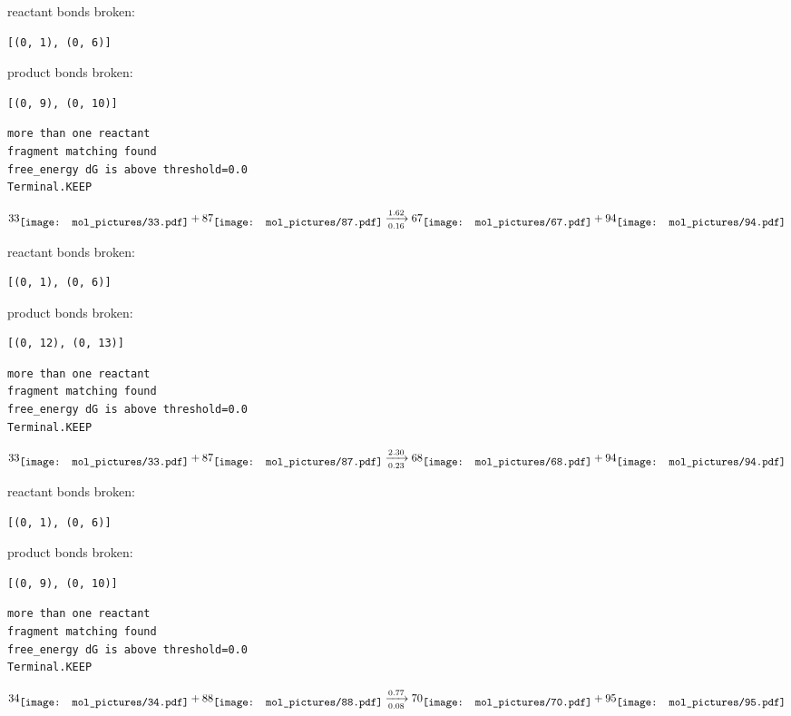 \documentclass{article}
\begin{document}
reactant bonds broken:\begin{verbatim}
[(0, 1), (0, 6)]
\end{verbatim}
product bonds broken:\begin{verbatim}
[(0, 9), (0, 10)]
\end{verbatim}




\vspace{1cm}
\begin{verbatim}
more than one reactant
fragment matching found
free_energy dG is above threshold=0.0
Terminal.KEEP
\end{verbatim}
$$
33
\raisebox{-.5\height}{\texttt{[image: mol\_pictures/33.pdf]}}
+
87
\raisebox{-.5\height}{\texttt{[image: mol\_pictures/87.pdf]}}
\xrightarrow[0.16]{1.62}
67
\raisebox{-.5\height}{\texttt{[image: mol\_pictures/67.pdf]}}
+
94
\raisebox{-.5\height}{\texttt{[image: mol\_pictures/94.pdf]}}
$$


reactant bonds broken:\begin{verbatim}
[(0, 1), (0, 6)]
\end{verbatim}
product bonds broken:\begin{verbatim}
[(0, 12), (0, 13)]
\end{verbatim}




\vspace{1cm}
\begin{verbatim}
more than one reactant
fragment matching found
free_energy dG is above threshold=0.0
Terminal.KEEP
\end{verbatim}
$$
33
\raisebox{-.5\height}{\texttt{[image: mol\_pictures/33.pdf]}}
+
87
\raisebox{-.5\height}{\texttt{[image: mol\_pictures/87.pdf]}}
\xrightarrow[0.23]{2.30}
68
\raisebox{-.5\height}{\texttt{[image: mol\_pictures/68.pdf]}}
+
94
\raisebox{-.5\height}{\texttt{[image: mol\_pictures/94.pdf]}}
$$


reactant bonds broken:\begin{verbatim}
[(0, 1), (0, 6)]
\end{verbatim}
product bonds broken:\begin{verbatim}
[(0, 9), (0, 10)]
\end{verbatim}




\vspace{1cm}
\begin{verbatim}
more than one reactant
fragment matching found
free_energy dG is above threshold=0.0
Terminal.KEEP
\end{verbatim}
$$
34
\raisebox{-.5\height}{\texttt{[image: mol\_pictures/34.pdf]}}
+
88
\raisebox{-.5\height}{\texttt{[image: mol\_pictures/88.pdf]}}
\xrightarrow[0.08]{0.77}
70
\raisebox{-.5\height}{\texttt{[image: mol\_pictures/70.pdf]}}
+
95
\raisebox{-.5\height}{\texttt{[image: mol\_pictures/95.pdf]}}
$$
\end{document}
